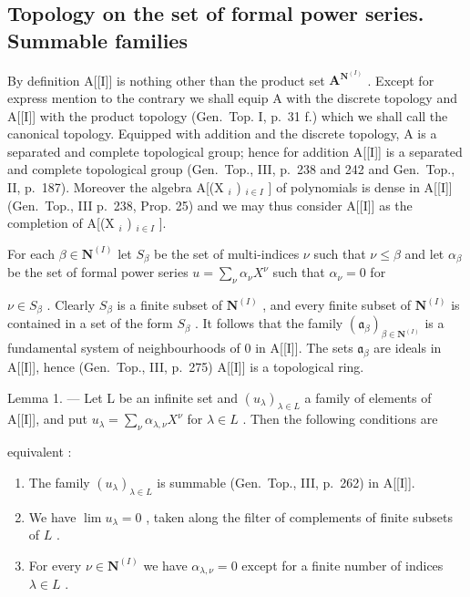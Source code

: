 \subsection{Topology on the set of formal power series. Summable families}

By definition A{[}{[}I{]}{]} is nothing other than the product set \(\mathbf{A}^{\mathbf{N}^{(I)}}\) . Except for express mention to the contrary we shall equip A with the discrete topology and A{[}{[}I{]}{]} with the product topology (Gen.~Top. I, p.~31 f.) which we shall call the canonical topology. Equipped with addition and the discrete topology, A is a separated and complete topological group; hence for addition A{[}{[}I{]}{]} is a separated and complete topological group (Gen.~Top., III, p.~238 and 242 and Gen.~Top., II, p.~187). Moreover the algebra A{[}(X \(_{i}\) ) \(_{i\in I}\) {]} of polynomials is dense in A{[}{[}I{]}{]} (Gen.~Top., III p.~238, Prop. 25) and we may thus consider A{[}{[}I{]}{]} as the completion of A{[}(X \(_{i}\) ) \(_{i\in I}\) {]}.

For each \(\beta \in \mathbf{N}^{(I)}\) let \(S_{\beta}\) be the set of multi-indices \(\nu\) such that \(\nu \leqslant \beta\) and let \(\alpha_{\beta}\) be the set of formal power series \(u = \sum_{\nu} \alpha_{\nu} X^{\nu}\) such that \(\alpha_{\nu} = 0\) for

\(\nu \in S_{\beta}\) . Clearly \(S_{\beta}\) is a finite subset of \(\mathbf{N}^{(I)}\) , and every finite subset of \(\mathbf{N}^{(I)}\) is contained in a set of the form \(S_{\beta}\) . It follows that the family \((\mathfrak{a}_{\beta})_{\beta \in \mathbf{N}^{(I)}}\) is a fundamental system of neighbourhoods of 0 in A{[}{[}I{]}{]}. The sets \(\mathfrak{a}_{\beta}\) are ideals in A{[}{[}I{]}{]}, hence (Gen.~Top., III, p.~275) A{[}{[}I{]}{]} is a topological ring.

Lemma 1. --- Let L be an infinite set and \((u_{\lambda})_{\lambda \in L}\) a family of elements of A{[}{[}I{]}{]}, and put \(u_{\lambda} = \sum_{\nu} \alpha_{\lambda, \nu} X^{\nu}\) for \(\lambda \in L\) . Then the following conditions are

equivalent :

\begin{enumerate}
\def\labelenumi{(\roman{enumi})}
\item
  The family \((u_{\lambda})_{\lambda \in L}\) is summable (Gen.~Top., III, p.~262) in A{[}{[}I{]}{]}.
\item
  We have \(\lim u_{\lambda} = 0\) , taken along the filter of complements of finite subsets of \(L\) .
\item
  For every \(\nu \in \mathbf{N}^{(I)}\) we have \(\alpha_{\lambda, \nu} = 0\) except for a finite number of indices \(\lambda \in L\) .
\end{enumerate}

